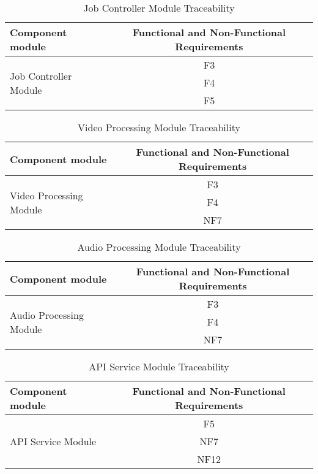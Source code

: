 \documentclass{article}
\begin{document}
\begin{table}[H]
    \caption{Job Controller Module Traceability}
    \centering
    \begin{tabular}{|l|c|} \hline
        \textbf{Component module} & \textbf{Functional and Non-Functional Requirements} \\ \hline
         \multirow{3}{*}{Job Controller Module} & F3 \\ \cline{2-2}
         & F4 \\ \cline{2-2}
         & F5 \\ \hline
    \end{tabular}
    \label{tab:Job_Controller_Traceability}
\end{table}

\begin{table}[H]
    \caption{Video Processing Module Traceability}
    \centering
    \begin{tabular}{|l|c|} \hline
        \textbf{Component module} & \textbf{Functional and Non-Functional Requirements} \\ \hline
         \multirow{3}{*}{Video Processing Module } & F3 \\ \cline{2-2}
         & F4 \\ \cline{2-2}
         & NF7 \\ \hline
    \end{tabular}
    \label{tab:Video_Processing_Module}
\end{table}

\begin{table}[H]
    \caption{Audio Processing Module Traceability}
    \centering
    \begin{tabular}{|l|c|} \hline
        \textbf{Component module} & \textbf{Functional and Non-Functional Requirements} \\ \hline
         \multirow{3}{*}{Audio Processing Module } & F3 \\ \cline{2-2}
         & F4 \\ \cline{2-2}
         & NF7 \\ \hline
    \end{tabular}
    \label{tab:Audio_Processing_Module}
\end{table}

\begin{table}[H]
    \caption{API Service Module Traceability}
    \centering
    \begin{tabular}{|l|c|} \hline
        \textbf{Component module} & \textbf{Functional and Non-Functional Requirements} \\ \hline
         \multirow{3}{*}{API Service Module} & F5 \\ \cline{2-2}
         & NF7 \\ \cline{2-2}
         & NF12 \\ \hline
    \end{tabular}
    \label{tab:API_Services_Module}
\end{table}
\end{document}
